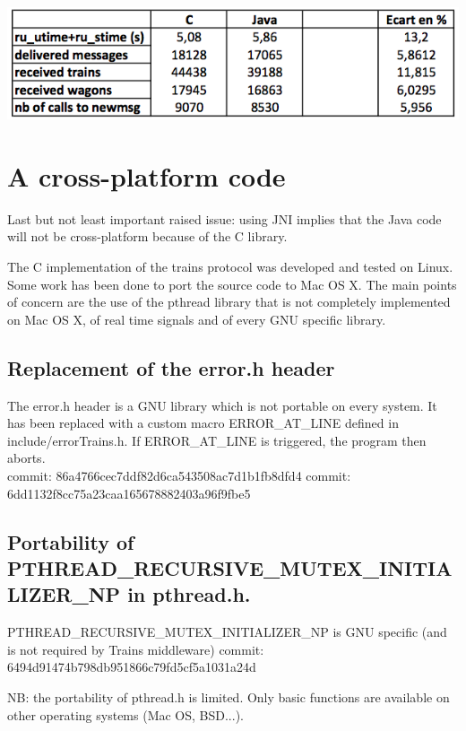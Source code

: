 \documentclass[a4paper,10pt]{report}
\begin{document}
\begin{center}
\includegraphics[scale=0.55]{img/perf.png}\\
\end{center}

\section{A cross-platform code}

Last but not least important raised issue: using JNI implies that the Java code will not be cross-platform because of the C library.

The C implementation of the trains protocol was developed and tested on Linux. Some work has been done to port the source code
to Mac OS X. The main points of concern are the use of the pthread library that is not completely implemented on Mac OS X, 
of real time signals and of every GNU specific library. 

\subsection{Replacement of the error.h header}
    The error.h header is a GNU library which is not portable on every
    system. It has been replaced with a custom macro ERROR\_AT\_LINE defined
    in include/errorTrains.h.
    If ERROR\_AT\_LINE is triggered, the program then aborts.\\

    commit: 86a4766cec7ddf82d6ca543508ac7d1b1fb8dfd4
    commit: 6dd1132f8cc75a23caa165678882403a96f9fbe5

\subsection{Portability of PTHREAD\_RECURSIVE\_MUTEX\_INITIALIZER\_NP in pthread.h.}

    PTHREAD\_RECURSIVE\_MUTEX\_INITIALIZER\_NP is GNU specific (and
    is not required by Trains middleware)
    commit: 6494d91474b798db951866c79fd5cf5a1031a24d
    
    NB: the portability of pthread.h is limited. Only basic functions are
    available on other operating systems (Mac OS, BSD...).\\
    
\end{document}
